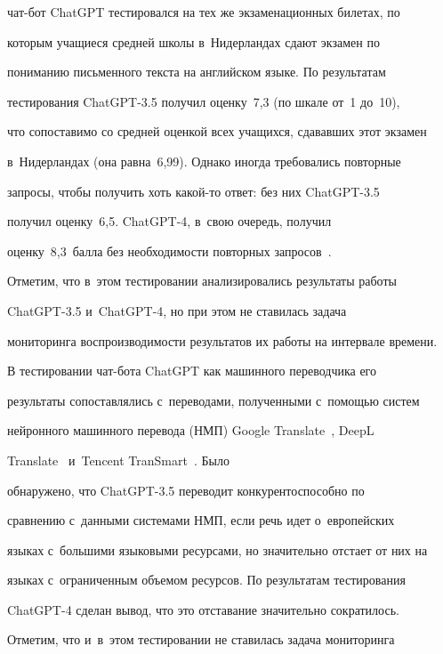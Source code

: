 чат-бот \mbox{ChatGPT} тес\-ти\-ро\-вал\-ся на тех же экзаменационных билетах, по 


которым учащиеся сред\-ней школы в~Нидерландах сдают экзамен по 


пониманию письменного текс\-та на английском языке. По результатам 


тес\-ти\-ро\-ва\-ния \mbox{ChatGPT-3.5} получил оценку~7,3 (по шкале от~1 до~10), 


что со\-по\-ста\-ви\-мо со сред\-ней оценкой всех учащихся, сда\-вав\-ших этот экзамен 


в~Нидерландах (она рав\-на~6,99). Однако иногда требовались по\-втор\-ные 


за\-про\-сы, чтобы получить хоть ка\-кой-то ответ: без них \mbox{ChatGPT-3.5} 


получил оцен\-ку~6,5. \mbox{ChatGPT-4}, в~свою очередь, получил 


оценку~8,3~балла без не\-об\-хо\-ди\-мости повторных запросов~\cite{6-eg}. 


Отметим, что в~этом тес\-ти\-ро\-ва\-нии анализировались результаты работы 


\mbox{ChatGPT-3.5} и~\mbox{ChatGPT-4}, но при этом не ставилась задача 


мониторинга вос\-про\-из\-во\-ди\-мости результатов их работы на интервале вре\-мени.


  


  В тестировании чат-бота ChatGPT как машинного переводчика его 


результаты со\-по\-став\-ля\-лись с~переводами, полученными с~по\-мощью сис\-тем 


нейронного машинного перевода (НМП) Google Translate~\cite{9-eg}, DeepL 


Translate~\cite{10-eg} и~\mbox{Tencent} \mbox{TranSmart}~\cite{11-eg}. Было 


обнаружено, что \mbox{ChatGPT-3.5} переводит кон\-ку\-рен\-то\-спо\-соб\-но по 


срав\-не\-нию с~данными сис\-те\-ма\-ми НМП, если речь идет о~европейских 


языках с~большими языковыми ресурсами, но значительно отстает от них на 


языках с~ограниченным объемом ресурсов. По результатам тестирования 


\mbox{ChatGPT-4} сделан вывод, что это отставание значительно со\-кра\-ти\-лось. 


Отметим, что и~в~этом тес\-ти\-ро\-ва\-нии не ставилась задача мониторинга 


